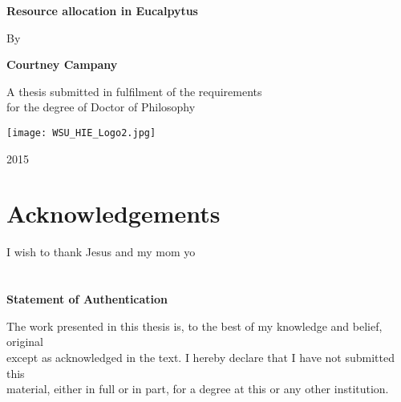 \documentclass[a4paper]{article}
\begin{document}



\begin{titlepage}
    \begin{center}
        \vspace*{1cm}
        
        \huge
        \textbf{Resource allocation in Eucalpytus}
        
        \vspace{3.5cm}
        
        \Large
        By\\
        
        \vspace{1cm}
        
        \LARGE
        \textbf{Courtney Campany}
        
        \vfill
        
        A thesis submitted in fulfilment of the requirements \\
        for the degree of Doctor of Philosophy\\
        
        \vspace{2.5cm}
        
        \texttt{[image: WSU\_HIE\_Logo2.jpg]}

        2015
        
    \end{center}
\end{titlepage}

\section*{Acknowledgements}
\thispagestyle{empty}
        \vspace{1.5cm}
        I wish to thank Jesus and my mom yo

\clearpage
\section*{}
\thispagestyle{empty}
    \begin{center}
      \vspace*{7cm}
        \LARGE
        \textbf{Statement of Authentication}
        \vspace{2.5cm}
        
        \normalsize
        The work presented in this thesis is, to the best of my knowledge and belief, original\\
        except as acknowledged in the text. I hereby declare that I have not submitted this\\
        material, either in full or in part, for a degree at this or any other institution.\\
        
    \end{center}
\clearpage
\end{document}
